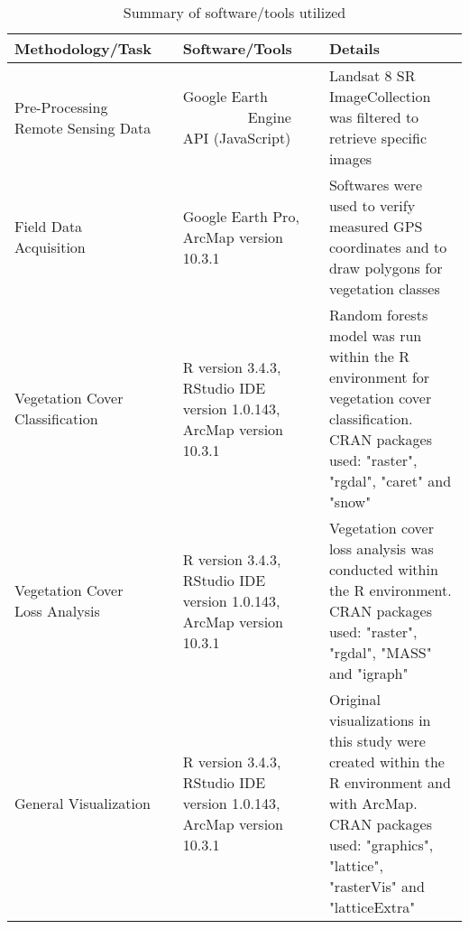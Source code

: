 \begin{table}[H]
	\centering
	\small
	\def\arraystretch{1.6}
	\begin{threeparttable}
		\caption{Summary of software/tools utilized}
		\label{tableSoftware}
		\begin{tabular}{L{5cm} L{0.5cm} L{3cm} L{0.5cm} L{4.5cm}}
			\toprule[0.25mm]
			Methodology/Task && Software/Tools && Details\\
			\midrule[0.35mm]
			Pre-Processing Remote Sensing Data && Google Earth ~~~~~~~~~Engine API (JavaScript) && Landsat 8 SR ImageCollection was filtered to retrieve specific images\\[0.15cm]
			Field Data Acquisition && Google Earth Pro, ArcMap version 10.3.1 && Softwares were used to verify measured GPS coordinates and to draw polygons for vegetation classes\\
			Vegetation Cover Classification && R version 3.4.3, RStudio IDE version 1.0.143, ArcMap version 10.3.1 && Random forests model was run within the R environment for vegetation cover classification. CRAN packages used: "raster", "rgdal", "caret" and "snow"\\
			Vegetation Cover Loss Analysis && R version 3.4.3, RStudio IDE version 1.0.143, ArcMap version 10.3.1 && Vegetation cover loss analysis was conducted within the R environment. CRAN packages used: "raster", "rgdal", "MASS" and "igraph"\\
			General Visualization && R version 3.4.3, RStudio IDE version 1.0.143, ArcMap version 10.3.1 && Original visualizations in this study were created within the R environment and with ArcMap. CRAN packages used: "graphics", "lattice", "rasterVis" and "latticeExtra" \\
			\bottomrule[0.25mm]
		\end{tabular}
	\end{threeparttable}
\end{table}



